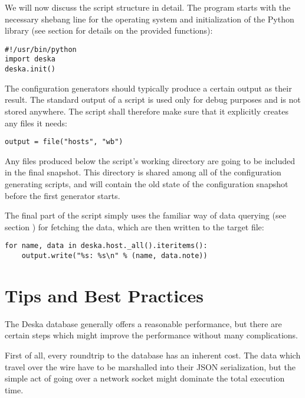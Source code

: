 \documentclass[deska]{subfiles}
\begin{document}
We will now discuss the script structure in detail.  The program starts with the necessary shebang line for the
operating system and initialization of the Python library (see section  for details on the
provided functions):

\begin{verbatim}
#!/usr/bin/python
import deska
deska.init()
\end{verbatim}

The configuration generators should typically produce a certain output as their result.  The standard output of a script
is used only for debug purposes and is not stored anywhere.  The script shall therefore make sure that it explicitly
creates any files it needs:

\begin{verbatim}
output = file("hosts", "wb")
\end{verbatim}

Any files produced below the script's working directory are going to be included in the final snapshot.  This directory
is shared among all of the configuration generating scripts, and will contain the old state of the configuration
snapshot before the first generator starts.

The final part of the script simply uses the familiar way of data querying (see section )
for fetching the data, which are then written to the target file:

\begin{verbatim}
for name, data in deska.host._all().iteritems():
    output.write("%s: %s\n" % (name, data.note))
\end{verbatim}

\section{Tips and Best Practices}

The Deska database generally offers a reasonable performance, but there are certain steps which might improve the
performance without many complications.

First of all, every roundtrip to the database has an inherent cost.  The data which travel over the wire have to be
marshalled into their JSON serialization, but the simple act of going over a network socket might dominate the total
execution time.
\end{document}

